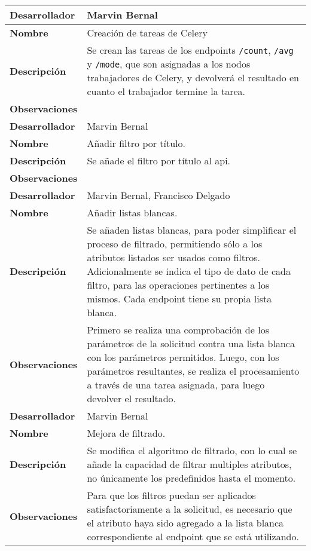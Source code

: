 \begin{longtable}{|l|m{4in}|}
\hline
\hline
\textbf{Desarrollador} & Marvin Bernal \\
\hline
\textbf{Nombre} & Creación de tareas de Celery\\
\hline
\textbf{Descripción} & Se crean las tareas de los endpoints \texttt{/count}, \texttt{/avg} y \texttt{/mode}, que son asignadas a los nodos trabajadores de Celery, y devolverá el resultado en cuanto el trabajador termine la tarea.
\\
\hline
\textbf{Observaciones} & \\

\hline
\hline
\textbf{Desarrollador} & Marvin Bernal \\
\hline
\textbf{Nombre} & Añadir filtro por título.\\
\hline
\textbf{Descripción} & Se añade el filtro por título al api.
\\
\hline
\textbf{Observaciones} &\\

\hline
\hline
\textbf{Desarrollador} & Marvin Bernal, Francisco Delgado \\
\hline
\textbf{Nombre} & Añadir listas blancas.\\
\hline
\textbf{Descripción} & Se añaden listas blancas, para poder simplificar el proceso de filtrado, permitiendo sólo a los atributos listados ser usados como filtros. Adicionalmente se indica el tipo de dato de cada filtro, para las operaciones pertinentes a los mismos. Cada endpoint tiene su propia lista blanca.
\\
\hline
\textbf{Observaciones} & Primero se realiza una comprobación de los parámetros de la
solicitud contra una lista blanca con los parámetros permitidos.
Luego, con los parámetros resultantes, se realiza el
procesamiento a través de una tarea asignada, para luego
devolver el resultado.\\

\hline
\hline
\textbf{Desarrollador} & Marvin Bernal \\
\hline
\textbf{Nombre} & Mejora de filtrado.\\
\hline
\textbf{Descripción} & Se modifica el algoritmo de filtrado, con lo cual se añade la capacidad de filtrar multiples atributos, no únicamente los predefinidos hasta el momento.
\\
\hline
\textbf{Observaciones} & Para que los filtros puedan ser aplicados satisfactoriamente a la solicitud, es necesario que el atributo haya sido agregado a la lista blanca correspondiente al endpoint que se está utilizando.\\


\end{longtable}
